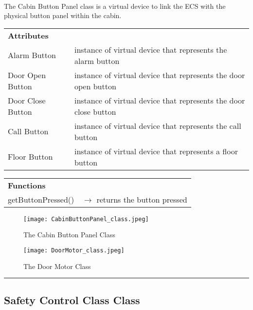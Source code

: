 \documentclass[12pt]{article}
\begin{document}
	\paragraph{} The Cabin Button Panel class is a virtual device to link the ECS with the physical button panel within the cabin.
	\begin{table}[H]
		\begin{tabular}{lp{12cm}}
			\textbf{Attributes} & \\ 
			Alarm Button        & instance of virtual device that represents the alarm button \\
		   	Door Open Button    & instance of virtual device that represents the door open button \\
			Door Close Button   & instance of virtual device that represents the door close button \\
			Call Button         & instance of virtual device that represents the call button \\
			Floor Button        & instance of virtual device that represents a floor button \\
		\end{tabular}
	\end{table}     
	\begin{table}[H]
		\begin{tabular}{lp{12cm}}
			\textbf{Functions}      & \\
			getButtonPressed()      & $\rightarrow$ returns the button pressed\\
		\end{tabular}
	\end{table}
    \begin{figure}[H]
  		\centerline{\texttt{[image: CabinButtonPanel\_class.jpeg]}}
  		\caption{The Cabin Button Panel Class}
  		\label{fig:CabinButtonPanel_class}
	\end{figure}
    \begin{figure}[H]
  		\centerline{\texttt{[image: DoorMotor\_class.jpeg]}}
  		\caption{The Door Motor Class}
  		\label{fig:DoorMotor_class}
	\end{figure}
	\par\noindent\rule{\textwidth}{0.4pt}
	
	\subsection*{Safety Control Class Class}
\end{document}
